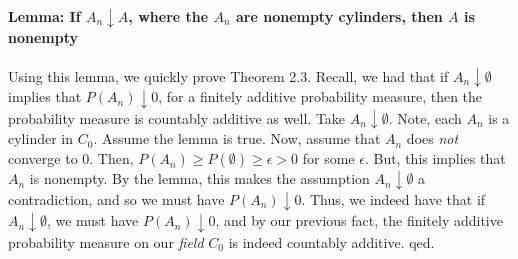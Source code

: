 \documentclass[12pt,a4paper]{article}
\newcommand{\1}[1]{\mathbbm{1}\left\{ #1 \right\}}
\begin{document}
\paragraph{Lemma: If $A_n \downarrow A$, where the $A_n$ are nonempty cylinders, then $A$ is nonempty} Using this lemma, we quickly prove Theorem 2.3. Recall, we had that if $A_n \downarrow \emptyset$ implies that $P(A_n) \downarrow 0$, for a finitely additive probability measure, then the probability measure is countably additive as well. Take $A_n \downarrow \emptyset$. Note, each $A_n$ is a cylinder in $C_0$. Assume the lemma is true. Now, assume that $A_n$ does \textit{not} converge to $0$. Then, $P(A_n) \geq P(\emptyset) \geq \epsilon > 0$ for some $\epsilon$. But, this implies that $A_n$ is nonempty. By the lemma, this makes the assumption $A_n \downarrow \emptyset$ a contradiction, and so we must have $P(A_n) \downarrow 0$. Thus, we indeed have that if $A_n \downarrow \emptyset$, we must have $P(A_n) \downarrow 0$, and by our previous fact, the finitely additive probability measure on our \textit{field} $C_0$ is indeed countably additive. qed.
\end{document}
